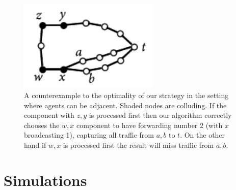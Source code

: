 \documentclass[reprint]{revtex4-1}
\begin{document}
\begin{figure}
\includegraphics[width=0.6\textwidth]{images/forwarding-ctex.pdf}
\caption{A counterexample to the optimality of our strategy in the setting where agents can be adjacent. Shaded nodes are colluding. If the component with $z,y$ is processed first then our algorithm correctly chooses the $w,x$ component to have forwarding number 2 (with $x$ broadcasting 1), capturing all traffic from $a,b$ to $t$.  On the other hand if $w,x$ is processed first the result will miss traffic from $a,b$.} \label{fig:forwarding-ctex}
\end{figure}


\section{Simulations} \label{sec:simulations}
 
\end{document}
